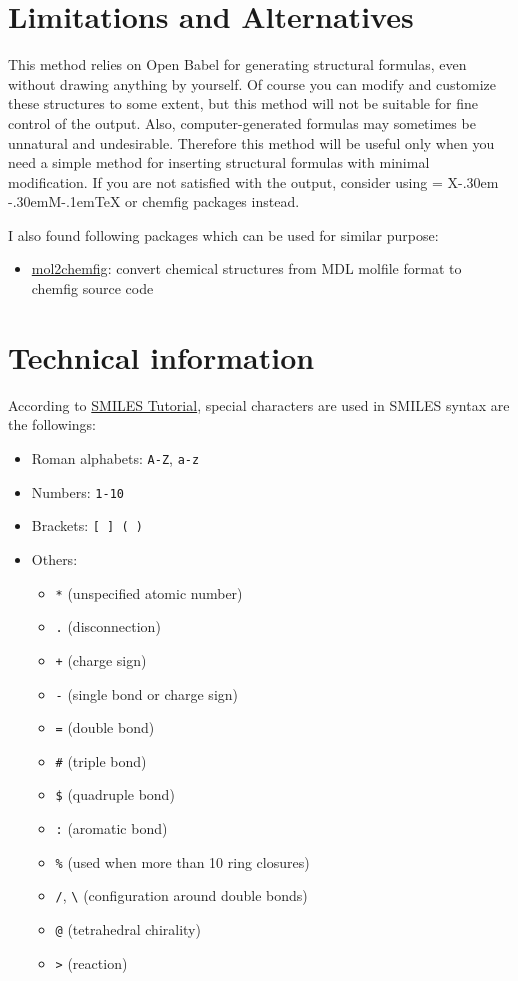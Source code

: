 \documentclass[12pt]{ltjsarticle}
\def\XyM{\ifnum\fam=-1\relax\fam=0\relax\fi\TestCount=\fam%
X\kern-.30em\smash{\raise.50ex\hbox{$\fam\TestCount\Upsilon$}}%
\kern-.30em{M}}
\def\XyMTeX{\XyM\kern-.1em\TeX}
\begin{document}
\clearpage

\section{Limitations and Alternatives}

This method relies on Open Babel for generating structural formulas,
even without drawing anything by yourself.
Of course you can modify and customize these structures to some extent,
but this method will not be suitable for fine control of the output.
Also, computer-generated formulas may sometimes be unnatural and undesirable.
Therefore this method will be useful only when you need a simple method
for inserting structural formulas with minimal modification.
If you are not satisfied with the output, consider using {\XyMTeX} or
\textsf{chemfig} packages instead.

I also found following packages which can be used for similar purpose:
\begin{itemize}
  \item \href{http://www.ctan.org/pkg/mol2chemfig}{\textsf{mol2chemfig}}:
    convert chemical structures from MDL molfile format
    to \textsf{chemfig} source code
\end{itemize}

\clearpage

\section{Technical information}
\label{detail}

According to
\href{http://www.daylight.com/meetings/summerschool98/course/dave/smiles-intro.html}{SMILES Tutorial},
special characters are used in SMILES syntax are the followings:
\begin{itemize}
\item Roman alphabets: \verb|A-Z|, \verb|a-z|
\item Numbers: \verb|1-10|
\item Brackets: \verb|[ ] ( )|
\item Others:
\begin{itemize}
\item \verb|*| (unspecified atomic number)
\item \verb|.| (disconnection)
\item \verb|+| (charge sign)
\item \verb|-| (single bond or charge sign)
\item \verb|=| (double bond)
\item \verb|#| (triple bond)
\item \verb|$| (quadruple bond)
\item \verb|:| (aromatic bond)
\item \verb|%| (used when more than 10 ring closures)
\item \verb|/|, \verb|\| (configuration around double bonds)
\item \verb|@| (tetrahedral chirality)
\item \verb|>| (reaction)
\end{itemize}
\end{itemize}
\end{document}
